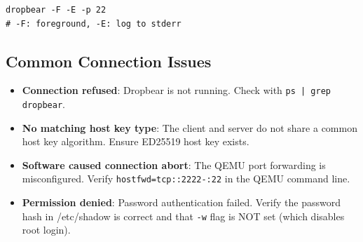 \begin{lstlisting}
dropbear -F -E -p 22
# -F: foreground, -E: log to stderr
\end{lstlisting}

\subsection{Common Connection Issues}

\begin{itemize}[nosep]
  \item \textbf{Connection refused}: Dropbear is not running. Check with
        \texttt{ps | grep dropbear}.
  \item \textbf{No matching host key type}: The client and server do not
        share a common host key algorithm. Ensure ED25519 host key exists.
  \item \textbf{Software caused connection abort}: The QEMU port forwarding
        is misconfigured. Verify \texttt{hostfwd=tcp::2222-:22} in the
        QEMU command line.
  \item \textbf{Permission denied}: Password authentication failed. Verify
        the password hash in /etc/shadow is correct and that \texttt{-w}
        flag is NOT set (which disables root login).
\end{itemize}
